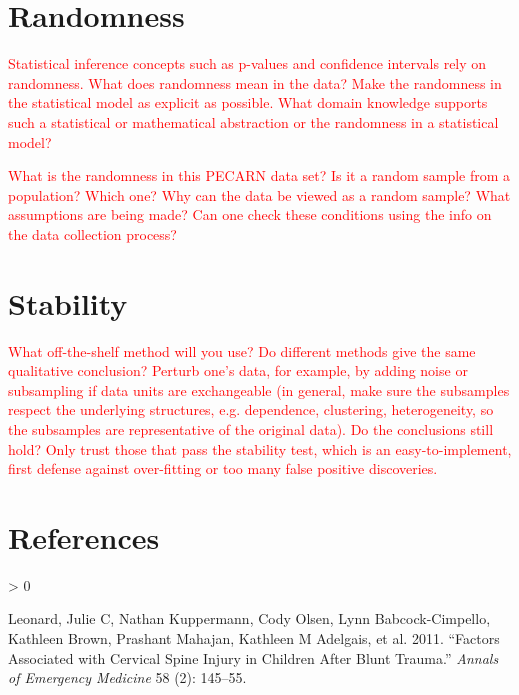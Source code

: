 \documentclass[
]{article}
\newlength{\cslhangindent}
\newenvironment{CSLReferences}[2] %
 {%
  \setlength{\parindent}{0pt}
  \ifodd #1 \everypar{\setlength{\hangindent}{\cslhangindent}}\ignorespaces\fi
  \ifnum #2 > 0
  \setlength{\parskip}{#2\baselineskip}
  \fi
 }%
 {}
\begin{document}
\hypertarget{randomness}{%
\section{Randomness}\label{randomness}}

\textcolor{red}{Statistical inference concepts such as p-values and confidence intervals rely on randomness. What does randomness mean in the data? Make the randomness in the statistical model as explicit as possible. What domain knowledge supports such a statistical or mathematical abstraction or the randomness in a statistical model?}

\textcolor{red}{What is the randomness in this PECARN data set? Is it a random sample from a population? Which one? Why can the data be viewed as a random sample? What assumptions are being made? Can one check these conditions using the info on the data collection process?}

\hypertarget{stability}{%
\section{Stability}\label{stability}}

\textcolor{red}{What off-the-shelf method will you use? Do different methods give the same qualitative conclusion? Perturb one’s data, for example, by adding noise or subsampling if data units are exchangeable (in general, make sure the subsamples respect the underlying structures, e.g. dependence, clustering, heterogeneity, so the subsamples are representative of the original data). Do the conclusions still hold? Only trust those that pass the stability test, which is an easy-to-implement, first defense against over-fitting or too many false positive discoveries.}

\hypertarget{references}{%
\section*{References}\label{references}}

\hypertarget{refs}{}
\begin{CSLReferences}{1}{0}
\leavevmode\hypertarget{ref-leonard2011factors}{}%
Leonard, Julie C, Nathan Kuppermann, Cody Olsen, Lynn Babcock-Cimpello,
Kathleen Brown, Prashant Mahajan, Kathleen M Adelgais, et al. 2011.
{``Factors Associated with Cervical Spine Injury in Children After Blunt
Trauma.''} \emph{Annals of Emergency Medicine} 58 (2): 145--55.

\end{CSLReferences}
\end{document}
